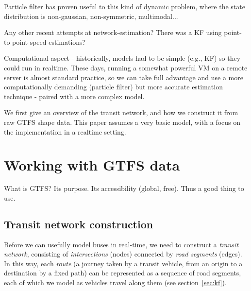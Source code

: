 \documentclass[times, doublespace]{anzsauth}
\begin{document}




Particle filter has proven useful to this kind of dynamic problem,
where the state distribution is non-gaussian, non-symmetric, 
multimodal...

Any other recent attempts at network-estimation?
There was a KF using point-to-point speed estimations? 

Computational aspect - historically, models had to be simple 
(e.g., KF) so they could run in realtime.
These days, running a somewhat powerful VM on a remote server
is almost standard practice, so we can take full advantage 
and use a more computationally demanding (particle filter)
but more accurate estimation technique - paired with a more complex model.

We first give an overview of the transit network,
and how we construct it from raw GTFS shape data.
This paper assumes a very basic model,
with a focus on the implementation in a realtime setting.




\section{Working with GTFS data}
\label{sec:gtfs}

What is GTFS? Its purpose. Its accessibility (global, free).
Thus a good thing to use.


\subsection{Transit network construction}
\label{sec:network_build}

Before we can usefully model buses in real-time, 
we need to construct a \emph{transit network},
consisting of \emph{intersections} (nodes)
connected by \emph{road segments} (edges).
In this way, each \emph{route} 
(a journey taken by a transit vehicle, from an origin to a destination by a fixed path)
can be represented as a sequence of road segments,
each of which we model as vehicles travel along them (see section~\ref{sec:kf}).
\end{document}
